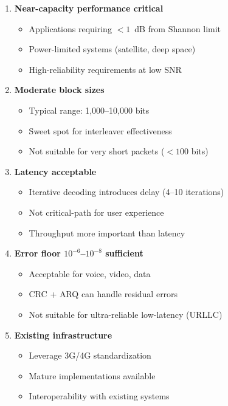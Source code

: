 \begin{enumerate}
\item \textbf{Near-capacity performance critical}
  \begin{itemize}
  \item Applications requiring $< 1$~dB from Shannon limit
  \item Power-limited systems (satellite, deep space)
  \item High-reliability requirements at low SNR
  \end{itemize}

\item \textbf{Moderate block sizes}
  \begin{itemize}
  \item Typical range: 1,000--10,000 bits
  \item Sweet spot for interleaver effectiveness
  \item Not suitable for very short packets ($< 100$ bits)
  \end{itemize}

\item \textbf{Latency acceptable}
  \begin{itemize}
  \item Iterative decoding introduces delay (4--10 iterations)
  \item Not critical-path for user experience
  \item Throughput more important than latency
  \end{itemize}

\item \textbf{Error floor $10^{-6}$--$10^{-8}$ sufficient}
  \begin{itemize}
  \item Acceptable for voice, video, data
  \item CRC + ARQ can handle residual errors
  \item Not suitable for ultra-reliable low-latency (URLLC)
  \end{itemize}

\item \textbf{Existing infrastructure}
  \begin{itemize}
  \item Leverage 3G/4G standardization
  \item Mature implementations available
  \item Interoperability with existing systems
  \end{itemize}
\end{enumerate}

